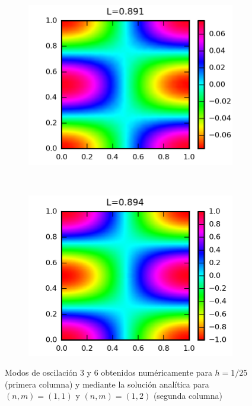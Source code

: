 \begin{figure}
  
  \begin{subfigure}{0.4\textwidth}
    \centering
    \includegraphics{figuras/modonum_6.png}
  \end{subfigure}
  ~
  \begin{subfigure}{0.4\textwidth}
    \centering
    \includegraphics{figuras/modoanalitico_1_2.png}
  \end{subfigure}   
  \caption{Modos de oscilaci\'on 3 y 6 obtenidos num\'ericamente para $h=1/25$ (primera columna) y mediante la soluci\'on anal\'itica para $(n,m)=(1,1)$ y $(n,m)=(1,2)$ (segunda columna)}
  \label{fig:modos_numericovsanalitico}
\end{figure}

